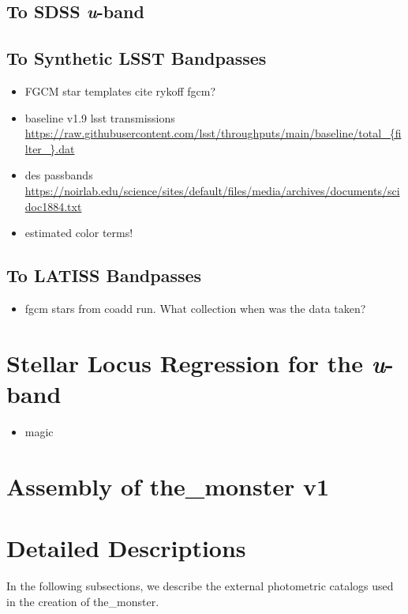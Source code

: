 \subsection{To SDSS \textit{u}-band}
\label{sec:tosdss}
\subsection{To Synthetic LSST Bandpasses}
\begin{itemize}
    \item FGCM star templates cite rykoff fgcm? 
    \item baseline v1.9 lsst transmissions \url{https://raw.githubusercontent.com/lsst/throughputs/main/baseline/total_{filter_}.dat}
    \item des passbands \url{https://noirlab.edu/science/sites/default/files/media/archives/documents/scidoc1884.txt}
    \item estimated color terms!
\end{itemize}
\subsection{To LATISS Bandpasses}
\begin{itemize}
    \item fgcm stars from coadd run. What collection when was the data taken? 
\end{itemize}

\section{Stellar Locus Regression for the \textit{u}-band}
\label{sec:slr}
\begin{itemize}
    \item magic 
\end{itemize}

\section{Assembly of the\_monster v1}
\label{sec:assembly}



\section{Detailed Descriptions}
\label{sec:details}
In the following subsections, we describe the external photometric catalogs used in the creation of the\_monster.

